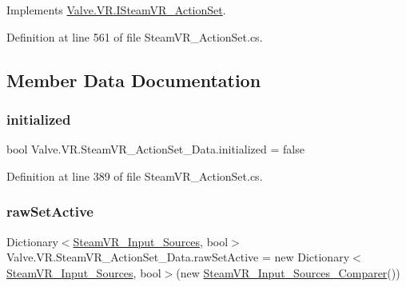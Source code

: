 Implements \mbox{\hyperlink{interface_valve_1_1_v_r_1_1_i_steam_v_r___action_set_a79f6520e36cd4bfa4ddb1388a8ff1b51}{Valve.\+V\+R.\+I\+Steam\+V\+R\+\_\+\+Action\+Set}}.



Definition at line 561 of file Steam\+V\+R\+\_\+\+Action\+Set.\+cs.



\subsection{Member Data Documentation}
\mbox{\label{class_valve_1_1_v_r_1_1_steam_v_r___action_set___data_a8ed7a27af3d170ad74d3904278da4a9e}} 
\subsubsection{\texorpdfstring{initialized}{initialized}}
{\footnotesize\ttfamily bool Valve.\+V\+R.\+Steam\+V\+R\+\_\+\+Action\+Set\+\_\+\+Data.\+initialized = false\hspace{0.3cm}{\ttfamily [protected]}}



Definition at line 389 of file Steam\+V\+R\+\_\+\+Action\+Set.\+cs.

\mbox{\label{class_valve_1_1_v_r_1_1_steam_v_r___action_set___data_ac472dc40ce5ea1b5b57f9f8297623ac2}} 
\subsubsection{\texorpdfstring{rawSetActive}{rawSetActive}}
{\footnotesize\ttfamily Dictionary$<$\mbox{\hyperlink{namespace_valve_1_1_v_r_a82e5bf501cc3aa155444ee3f0662853f}{Steam\+V\+R\+\_\+\+Input\+\_\+\+Sources}}, bool$>$ Valve.\+V\+R.\+Steam\+V\+R\+\_\+\+Action\+Set\+\_\+\+Data.\+raw\+Set\+Active = new Dictionary$<$\mbox{\hyperlink{namespace_valve_1_1_v_r_a82e5bf501cc3aa155444ee3f0662853f}{Steam\+V\+R\+\_\+\+Input\+\_\+\+Sources}}, bool$>$(new \mbox{\hyperlink{struct_valve_1_1_v_r_1_1_steam_v_r___input___sources___comparer}{Steam\+V\+R\+\_\+\+Input\+\_\+\+Sources\+\_\+\+Comparer}}())\hspace{0.3cm}{\ttfamily [protected]}}



